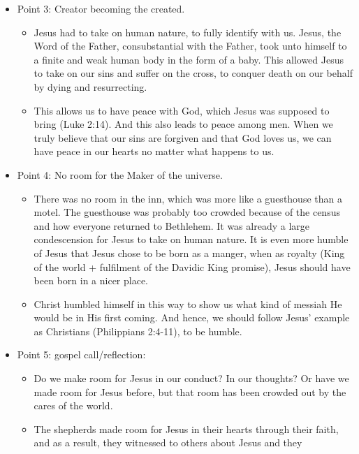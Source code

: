 \begin{itemize}
{\begin{itemize}
{    yet, we know that Jesus is not only the Lord of the Jews, but of the
    Gentiles too.}
  \end{itemize}}
  \item{Point 3: Creator becoming the created.
  \begin{itemize}
    \item{Jesus had to take on human nature, to fully identify with us.
    Jesus, the Word of the Father, consubstantial with the Father, took unto
    himself to a finite and weak human body in the form of a baby.  This
    allowed Jesus to take on our sins and suffer on the cross, to conquer
    death on our behalf by dying and resurrecting.  }
    \item{This allows us to have peace with God, which Jesus was supposed to
    bring (Luke 2:14).  And this also leads to peace among men.  When we
    truly believe that our sins are forgiven and that God loves us, we can
    have peace in our hearts no matter what happens to us.}
  \end{itemize} }
  \item{Point 4: No room for the Maker of the universe.
  \begin{itemize}
    \item{There was no room in the inn, which was more like a guesthouse than
    a motel.  The guesthouse was probably too crowded because of the census
    and how everyone returned to Bethlehem.  It was already a large
    condescension for Jesus to take on human nature.  It is even more humble
    of Jesus that Jesus chose to be born as a manger, when as royalty (King
    of the world + fulfilment of the Davidic King promise), Jesus should have
    been born in a nicer place.}
    \item{Christ humbled himself in this way to show us what kind of messiah
    He would be in His first coming.  And hence, we should follow Jesus'
    example as Christians (Philippians 2:4-11), to be humble.}
  \end{itemize} }
  \item{Point 5: gospel call/reflection:
  \begin{itemize}
    \item{Do we make room for Jesus in our conduct?  In our thoughts?  Or
    have we made room for Jesus before, but that room has been crowded out by
    the cares of the world.}
    \item{The shepherds made room for Jesus in their hearts through their
    faith, and as a result, they witnessed to others about Jesus and they
}
\end{itemize}}
\end{itemize}
